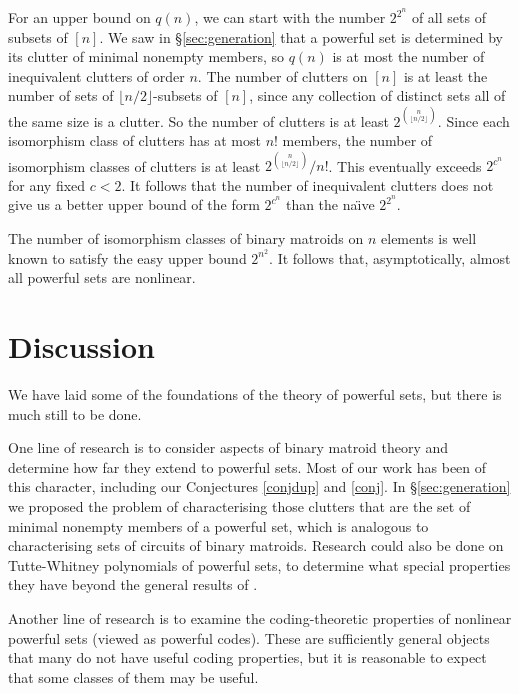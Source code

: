 \documentclass[12pt]{article}
\begin{document}
For an upper bound on $q(n)$, we can start with the number $2^{2^n}$
of all sets of subsets of $[n]$.  We saw in \S\ref{sec:generation}
that a powerful set is determined by its clutter of minimal nonempty members, so $q(n)$
is at most the number of inequivalent clutters of order $n$.
The number of clutters on $[n]$ is at least the number of sets of $\lfloor n/2\rfloor$-subsets of $[n]$, since any collection of distinct sets all of the same size is a clutter.
So the number of clutters is at least $2^{n\choose\lfloor n/2\rfloor}$.  Since each isomorphism
class of clutters has at most $n!$ members, the number of isomorphism classes of clutters
is at least $2^{n\choose\lfloor n/2\rfloor}/n!$.  This eventually
exceeds $2^{c^n}$ for any fixed $c<2$.
It follows that the number of inequivalent clutters does not give us a better upper bound
of the form $2^{c^n}$ than the na\"\i ve $2^{2^n}$.

The number of isomorphism classes of binary matroids on $n$ elements is well known to
satisfy the easy upper bound $2^{n^2}$.  It follows that, asymptotically, almost all powerful
sets are nonlinear.



\section{Discussion}\label{sec:discussion}

We have laid some of the foundations of the theory of powerful sets, but there is much still
to be done.

One line of research is to consider aspects of binary matroid theory and determine
how far they extend to powerful sets.  Most of our work has been of this character,
including our Conjectures \ref{conjdup} and \ref{conj}.
In \S\ref{sec:generation} we proposed the problem of
characterising those clutters that are the set of minimal nonempty members of a powerful set,
which is analogous to characterising sets of circuits of binary matroids.
Research could also be done on Tutte-Whitney polynomials of powerful sets,
to determine what special properties they have beyond the general results of \cite{farr93,farr04}.

Another line of research is to examine the coding-theoretic properties of nonlinear powerful sets (viewed as powerful codes).  These are sufficiently general objects that many do not have
useful coding properties, but it is reasonable to expect that some classes of them
may be useful.
\end{document}
